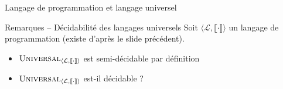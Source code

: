 \begin{frame}{Langage de programmation et langage universel}
  \begin{alertblock}{Remarques -- Décidabilité des langages universels}
    Soit $\langle \mathcal{L}, \llbracket \cdot \rrbracket \rangle$ un langage de programmation (existe d'après le slide précédent). 

    \begin{itemize}
    \item $\textsc{Universal}_{\langle \mathcal{L}, \llbracket \cdot \rrbracket \rangle}$ est semi-décidable par définition
    \item $\textsc{Universal}_{\langle \mathcal{L}, \llbracket \cdot \rrbracket \rangle}$ est-il décidable ?
    \end{itemize}
  \end{alertblock}

\end{frame}

\endgroup
